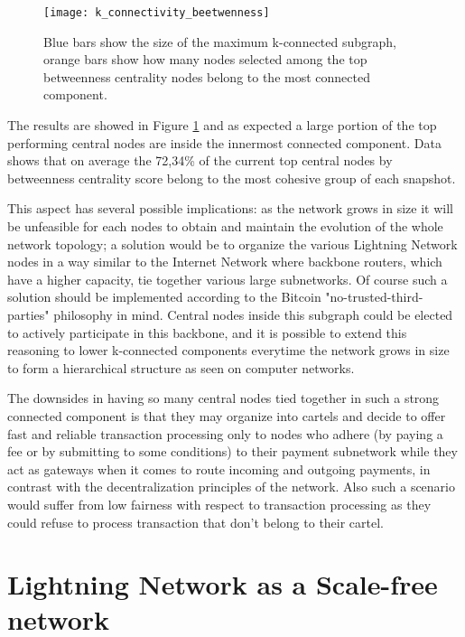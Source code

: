 	\begin{figure}
		\texttt{[image: k\_connectivity\_beetwenness]}
		\caption{Blue bars show the size of the maximum k-connected subgraph, orange bars show how many nodes selected among the top betweenness centrality nodes belong to the most connected component.}
		\label{monthyl_k_connectivity_betweenness}
	\end{figure}
	
	The results are showed in Figure \ref{monthyl_k_connectivity_betweenness} and as expected a large portion of the top performing central nodes are inside the innermost connected component. Data shows that on average the 72,34\% of the current top central nodes by betweenness centrality score belong to the most cohesive group of each snapshot.
	
	This aspect has several possible implications: as the network grows in size it will be unfeasible for each nodes to obtain and maintain the evolution of the whole network topology; a solution would be to organize the various Lightning Network nodes in a way similar to the Internet Network where backbone routers, which have a higher capacity, tie together various large subnetworks. Of course such a solution should be implemented according to the Bitcoin "no-trusted-third-parties" philosophy in mind. Central nodes inside this subgraph could be elected to actively participate in this backbone, and it is possible to extend this reasoning to lower k-connected components everytime the network grows in size to form a hierarchical structure as seen on computer networks. 
	
	The downsides in having so many central nodes tied together in such a strong connected component is that they may organize into cartels and decide to offer fast and reliable transaction processing only to nodes who adhere (by paying a fee or by submitting to some conditions) to their payment subnetwork while they act as gateways when it comes to route incoming and outgoing payments, in contrast with the decentralization principles of the network. Also such a scenario would suffer from low fairness with respect to transaction processing as they could refuse to process transaction that don't belong to their cartel.

	\section{Lightning Network as a Scale-free network}
	
